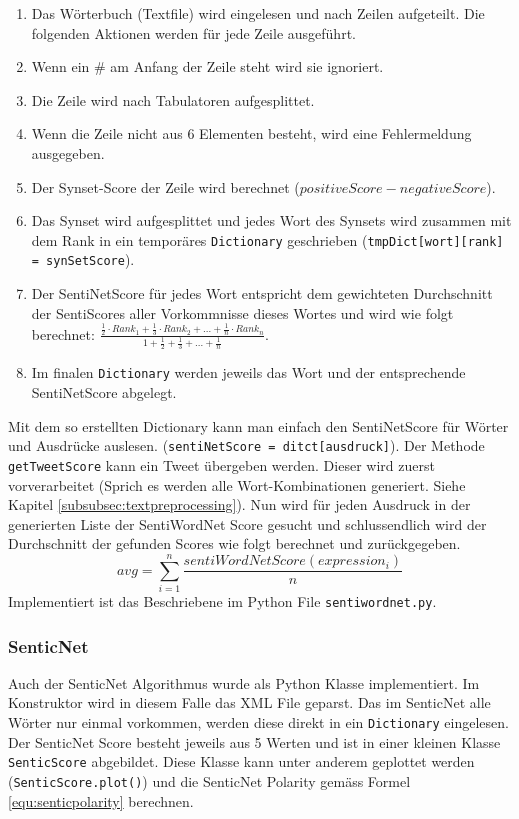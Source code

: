 \begin{enumerate}
	\item Das Wörterbuch (Textfile) wird eingelesen und nach Zeilen aufgeteilt. Die folgenden Aktionen werden für jede Zeile ausgeführt.
	\item Wenn ein \# am Anfang der Zeile steht wird sie ignoriert.
	\item Die Zeile wird nach Tabulatoren aufgesplittet.
	\item Wenn die Zeile nicht aus 6 Elementen besteht, wird eine Fehlermeldung ausgegeben.
	\item Der Synset-Score der Zeile wird berechnet ($positiveScore - negativeScore$).
	\item Das Synset wird aufgesplittet und jedes Wort des Synsets wird zusammen mit dem Rank in ein temporäres \lstinline$Dictionary$ geschrieben (\lstinline$tmpDict[wort][rank] = synSetScore$).
	\item Der SentiNetScore für jedes Wort entspricht dem gewichteten Durchschnitt der SentiScores aller Vorkommnisse dieses Wortes und wird wie folgt berechnet: $\frac{\frac{1}{2}\cdot Rank_1 + \frac{1}{3} \cdot Rank_2 + ... + \frac{1}{n} \cdot Rank_n}{1+\frac{1}{2}+\frac{1}{3}+...+\frac{1}{n}}$.
	\item Im finalen \lstinline$Dictionary$ werden jeweils das Wort und der entsprechende SentiNetScore abgelegt.
\end{enumerate}

Mit dem so erstellten Dictionary kann man einfach den SentiNetScore für Wörter und Ausdrücke auslesen. (\lstinline$sentiNetScore = ditct[ausdruck]$). Der Methode \lstinline$getTweetScore$ kann ein Tweet übergeben werden. Dieser wird zuerst vorverarbeitet (Sprich es werden alle Wort-Kombinationen generiert. Siehe Kapitel \ref{subsubsec:textpreprocessing}). Nun wird für jeden Ausdruck in der generierten Liste der SentiWordNet Score gesucht und schlussendlich wird der Durchschnitt der gefunden Scores wie folgt berechnet und zurückgegeben.
\begin{equation}
avg = \sum_{i=1}^{n} \frac{sentiWordNetScore(expression_i)}{n}
\end{equation}
Implementiert ist das Beschriebene im Python File \lstinline$sentiwordnet.py$.

\subsubsection{SenticNet}
Auch der SenticNet Algorithmus wurde als Python Klasse implementiert. Im Konstruktor wird in diesem Falle das XML File geparst. Das im SenticNet alle Wörter nur einmal vorkommen, werden diese direkt in ein \lstinline$Dictionary$ eingelesen. Der SenticNet Score besteht jeweils aus 5 Werten und ist in einer kleinen Klasse \lstinline$SenticScore$ abgebildet. Diese Klasse kann unter anderem geplottet werden (\lstinline$SenticScore.plot()$) und die SenticNet Polarity gemäss Formel \ref{equ:senticpolarity} berechnen.

